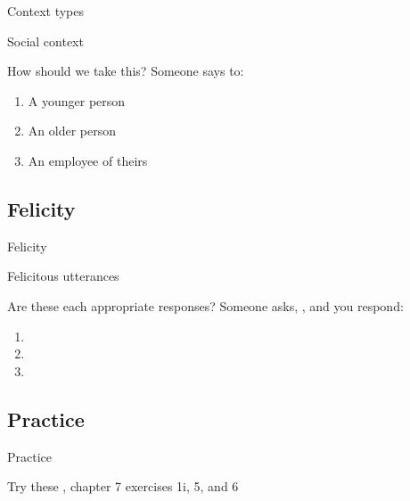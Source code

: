 \documentclass{beamer}
\newcommand{\subonethree}{Context types}
\newcommand{\subonefour}{Felicity}
\newcommand{\subonefive}{Practice}
\begin{document}
      \begin{frame}{\subonethree}
        \begin{alertblock}{Social context}
          
        \end{alertblock}
        \begin{block}{How should we take this?}
          Someone says  to:
          \begin{enumerate}
            \item A younger person
            \item An older person
            \item An employee of theirs
          \end{enumerate}
        \end{block}
      \end{frame}

    \subsection{\subonefour}
      \begin{frame}{\subonefour}
        \begin{alertblock}{Felicitous utterances}
          
        \end{alertblock}
        \begin{block}{Are these each appropriate responses?}
          Someone asks, , and you respond:
          \begin{enumerate}
            \item {}
            \item {}
            \item {}
          \end{enumerate}
        \end{block}
      \end{frame}

    \subsection{\subonefive}
      \begin{frame}{\subonefive}
        \begin{block}{Try these}
          \textcite{dawson_language_2016}, chapter 7 exercises 1i, 5, and 6
        \end{block}
      \end{frame}
\end{document}
